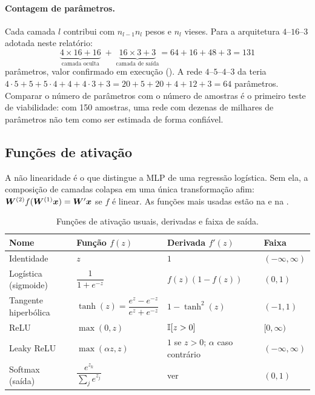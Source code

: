 \paragraph{Contagem de parâmetros.} Cada camada $l$ contribui com $n_{l-1}n_l$ pesos e $n_l$
vieses. Para a arquitetura $4$--$16$--$3$ adotada neste relatório:
\begin{equation}
	\underbrace{4 \times 16 + 16}_{\text{camada oculta}} \;+\;
	\underbrace{16 \times 3 + 3}_{\text{camada de saída}} = 64 + 16 + 48 + 3 = 131
	\label{eq:parametros}
\end{equation}
parâmetros, valor confirmado em execução (\parametrosMLP{}). A rede $4$--$5$--$4$--$3$ da
 teria $4\cdot5+5 + 5\cdot4+4 + 4\cdot3+3 = 20+5+20+4+12+3 = 64$
parâmetros. Comparar o número de parâmetros com o número de amostras é o primeiro teste de
viabilidade: com 150 amostras, uma rede com dezenas de milhares de parâmetros não tem como ser
estimada de forma confiável.

\subsection{Funções de ativação}

A não linearidade é o que distingue a MLP de uma regressão logística. Sem ela, a composição de
camadas colapsa em uma única transformação afim: $\bm{W}^{(2)}f(\bm{W}^{(1)}\bm{x}) = \bm{W}'\bm{x}$ se $f$ é
linear. As funções mais usadas estão na  e na
.

\begin{table}[htbp]
	\centering
	\caption{Funções de ativação usuais, derivadas e faixa de saída.}
	\label{tab:ativacoes-math}
	\small
	\begin{tabular}{L{2.6cm} L{4.2cm} L{4.3cm} L{2.4cm}}
		\toprule
		\textbf{Nome} & \textbf{Função $f(z)$} & \textbf{Derivada $f'(z)$} & \textbf{Faixa} \\
		\midrule
		Identidade & $z$ & $1$ & $(-\infty,\infty)$ \\
		Logística (sigmoide) & $\dfrac{1}{1+e^{-z}}$ & $f(z)\left(1-f(z)\right)$ & $(0,1)$ \\
		Tangente hiperbólica & $\tanh(z) = \dfrac{e^{z}-e^{-z}}{e^{z}+e^{-z}}$ & $1-\tanh^2(z)$ & $(-1,1)$ \\
		ReLU & $\max(0,z)$ & $\mathbb{I}[z>0]$ & $[0,\infty)$ \\
		Leaky ReLU & $\max(\alpha z, z)$ & $1$ se $z>0$; $\alpha$ caso contrário & $(-\infty,\infty)$ \\
		Softmax (saída) & $\dfrac{e^{z_k}}{\sum_j e^{z_j}}$ & ver  & $(0,1)$ \\
		\bottomrule
	\end{tabular}
\end{table}

